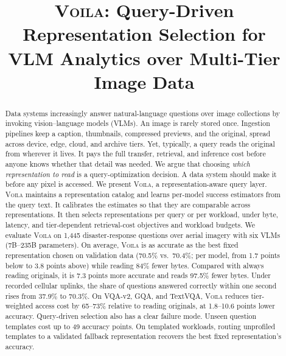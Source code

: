 \documentclass[10pt,conference]{IEEEtran}
\newcommand{\system}{\textsc{Voila}\xspace}
\begin{document}
\title{\system: Query-Driven Representation Selection for\\
VLM Analytics over Multi-Tier Image Data}

\author{
}

\maketitle

\begin{abstract}
Data systems increasingly answer natural-language questions over image
collections by invoking vision--language models (VLMs). An image is rarely
stored once. Ingestion pipelines keep a caption, thumbnails, compressed
previews, and the original, spread across device, edge, cloud, and archive
tiers. Yet, typically, a query reads the original from wherever it lives. It pays the
full transfer, retrieval, and inference cost before anyone knows whether that
detail was needed. We argue that choosing \emph{which representation to read}
is a query-optimization decision. A data system should make it before any
pixel is accessed. We present \system, a representation-aware query layer.
\system maintains a representation catalog and learns per-model success
estimators from the query text. It calibrates the estimates so that they are
comparable across representations. It then selects representations per query
or per workload, under byte, latency, and tier-dependent retrieval-cost
objectives and workload budgets. We
evaluate \system on 1,445 disaster-response questions over aerial imagery with
six VLMs (7B--235B parameters). On average, \system is as accurate as the best
fixed representation chosen on validation data (70.5\% vs.\ 70.4\%; per model,
from 1.7 points below to 3.8 points above) while reading 84\% fewer bytes. Compared
with always reading originals, it is 7.3 points more accurate and reads 97.5\%
fewer bytes. Under recorded cellular uplinks, the share of questions answered
correctly within one second rises from 37.9\% to 70.3\%. On VQA-v2, GQA, and
TextVQA, \system reduces tier-weighted access cost by 65--73\% relative to
reading originals, at 1.8--10.6 points lower accuracy. Query-driven selection
also has a clear failure mode. Unseen question templates cost up to 49 accuracy
points. On templated workloads, routing unprofiled templates to a validated
fallback representation recovers the best fixed representation's accuracy.
\end{abstract}
\end{document}
